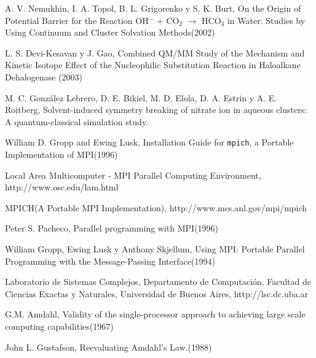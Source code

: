 \documentclass[a4paper, 12pt]{article}
\begin{document}
\begin{thebibliography}{9}

 A. V. Nemukhin, I. A. Topol, B. L. Grigorenko y S. K. Burt, On the Origin of Potential Barrier for the Reaction OH$^-$ + CO$_2$ $\rightarrow$ HCO$_3$ in Water: Studies by Using Continuum and Cluster Solvation
Methods(2002)

 L. S. Devi-Kesavan y J. Gao, Combined QM/MM Study of the Mechanism and Kinetic Isotope Effect
of the Nucleophilic Substitution Reaction in Haloalkane
Dehalogenase (2003)

 M. C. Gonz\'alez Lebrero, D. E. Bikiel, M. D. Elola, D. A. Estrin y A. E. Roitberg,
Solvent-induced symmetry breaking of nitrate ion in aqueous clusters: A quantum-classical simulation study.

 William D. Gropp and Ewing Lusk, Installation Guide for {\tt mpich}, a Portable Implementation of
{MPI}(1996)

 Local Area Multicomputer - MPI Parallel Computing Environment, http://www.osc.edu/lam.html

 MPICH(A Portable MPI Implementation), http://www.mcs.anl.gov/mpi/mpich

 Peter S. Pacheco, Parallel programming with MPI(1996)

 William Gropp, Ewing Lusk y Anthony Skjellum, Using MPI: Portable Parallel Programming with the Message-Passing
Interface(1994)

 Laboratorio de Sistemas Complejos, Departamento de Computaci\'on, Facultad de Ciencias Exactas y Naturales, Universidad de Buenos Aires, http://lsc.dc.uba.ar

 G.M. Amdahl, Validity of the single-processor approach to achieving large scale computing capabilities(1967)

John L. Gustafson, Reevaluating Amdahl's Law.(1988)

\end{thebibliography}
\end{document}
